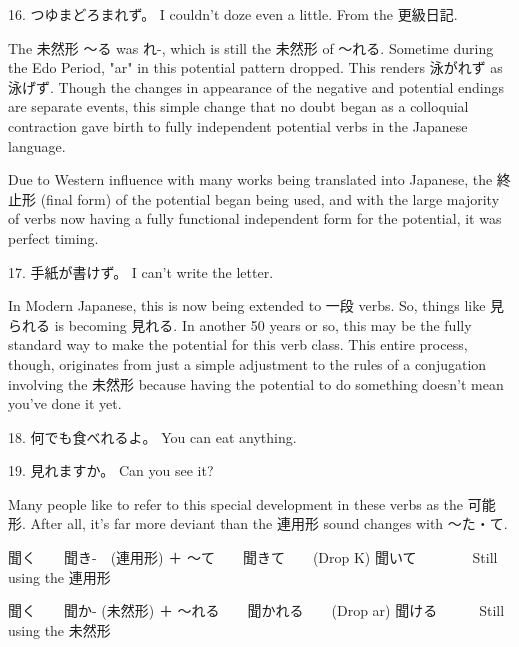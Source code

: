 \par{16. つゆまどろまれず。 \hfill\break
I couldn't doze even a little. \hfill\break
From the 更級日記. }

\par{ The 未然形 ～る was れ-, which is still the 未然形 of ～れる. Sometime during the Edo Period, "ar" in this potential pattern dropped. This renders 泳がれず as 泳げず. Though the changes in appearance of the negative and potential endings are separate events, this simple change that no doubt began as a colloquial contraction gave birth to fully independent potential verbs in the Japanese language. }

\par{ Due to Western influence with many works being translated into Japanese, the 終止形 (final form) of the potential began being used, and with the large majority of verbs now having a fully functional independent form for the potential, it was perfect timing. }

\par{17. 手紙が書けず。 \hfill\break
I can't write the letter. }

\par{ In Modern Japanese, this is now being extended to 一段 verbs. So, things like 見られる is becoming 見れる. In another 50 years or so, this may be the fully standard way to make the potential for this verb class. This entire process, though, originates from just a simple adjustment to the rules of a conjugation involving the 未然形 because having the potential to do something doesn't mean you've done it yet. }

\par{18. 何でも食べれるよ。 \hfill\break
You can eat anything. }

\par{19. 見れますか。 \hfill\break
Can you see it? }

\par{ Many people like to refer to this special development in these verbs as the 可能形. After all, it's far more deviant than the 連用形 sound changes with ～た・て. }

\par{聞く　\textrightarrow 　聞き-　(連用形) ＋ ～て　\textrightarrow 　聞きて　\textrightarrow 　(Drop K) 聞いて　　　　Still using the 連用形 }

\par{聞く　\textrightarrow 　聞か- (未然形) ＋ ～れる　\textrightarrow 　聞かれる　\textrightarrow 　(Drop ar) 聞ける　　　Still using the 未然形 }

